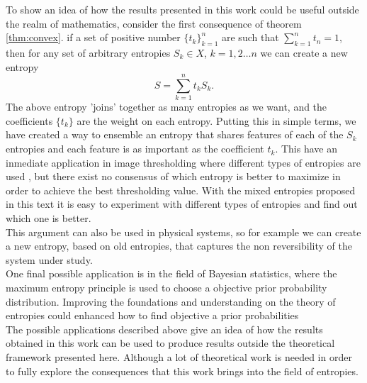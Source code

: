 \documentclass[11pt]{article}
\theoremstyle{plain}
\begin{document}
To show an idea of how the results presented in this work could be useful outside the realm of mathematics, consider the first  consequence of theorem \ref{thm:convex}. if a set of positive number $\{t_{k}\}_{k=1}^{n}$ are such that $\sum_{k=1}^{n} t_{n}=1$, then for any set of arbitrary entropies $S_{k}\in X$, $k=1,2\ldots n$ we can create a new entropy
\begin{equation}
S=\sum_{k=1}^{n} t_{k}S_{k}.
\end{equation}
The above entropy 'joins' together as many entropies as we want, and the coefficients $\{t_{k}\}$ are the weight on each entropy. Putting this in simple terms, we have created a way to ensemble an entropy that shares features of each of the $S_{k}$ entropies and each feature is as important as the coefficient $t_{k}$.
This have an inmediate application in image thresholding
\cite{Kappur, Matlab} where different types of entropies are used
\cite{renyisthreshold,Tsallisthreshold}, but there exist no
consensus of which entropy is better to maximize in order to
achieve the best thresholding value. With the mixed entropies
proposed in this text it is easy to experiment with different
types of entropies and find out which one is better. 
\smallskip
\\
This argument can also be used in physical systems, so for example we can create a new entropy, based on old entropies, that captures the non reversibility of  the system under study.
\smallskip
\\
One final possible application is in the field of Bayesian statistics, where  the maximum entropy principle is used to choose a objective prior probability distribution. Improving the foundations and understanding on the theory of entropies could enhanced how to find objective a prior probabilities
\newline
\\
The possible applications described above give an idea of how the results obtained in this work can be used to produce results outside the theoretical framework presented here. Although a lot of theoretical work is needed in order to fully explore the consequences that this work brings into the field of entropies.





\newpage






\end{document}
